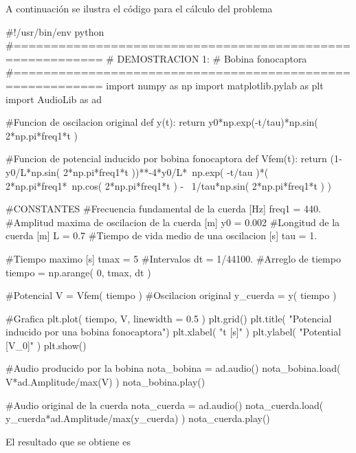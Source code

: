 A continuación se ilustra el código para el cálculo del problema 
\begin{listing}[style=python]
#!/usr/bin/env python
#==========================================================
# DEMOSTRACION 1:
# Bobina fonocaptora
#==========================================================
import numpy as np
import matplotlib.pylab as plt
import AudioLib as ad

#Funcion de oscilacion original
def y(t):
    return y0*np.exp(-t/tau)*np.sin( 2*np.pi*freq1*t )

#Funcion de potencial inducido por bobina fonocaptora
def Vfem(t):
    return (1-y0/L*np.sin( 2*np.pi*freq1*t ))**-4*y0/L*\
    np.exp( -t/tau )*( 2*np.pi*freq1*\
    np.cos( 2*np.pi*freq1*t ) - \
    1/tau*np.sin( 2*np.pi*freq1*t ) )


#CONSTANTES
#Frecuencia fundamental de la cuerda [Hz]
freq1 = 440.
#Amplitud maxima de oscilacion de la cuerda [m]
y0 = 0.002
#Longitud de la cuerda [m]
L = 0.7
#Tiempo de vida medio de una oscilacion [s]
tau = 1.

#Tiempo maximo [s]
tmax = 5
#Intervalos
dt = 1/44100.
#Arreglo de tiempo 
tiempo = np.arange( 0, tmax, dt )

#Potencial
V = Vfem( tiempo )
#Oscilacion original
y_cuerda = y( tiempo )

#Grafica
plt.plot( tiempo, V, linewidth = 0.5 )
plt.grid()
plt.title( "Potencial inducido por una bobina fonocaptora")
plt.xlabel( "t [s]" )
plt.ylabel( "Potential [V_0]" )
plt.show()

#Audio producido por la bobina
nota_bobina = ad.audio()
nota_bobina.load( V*ad.Amplitude/max(V) )
nota_bobina.play()

#Audio original de la cuerda
nota_cuerda = ad.audio()
nota_cuerda.load( y_cuerda*ad.Amplitude/max(y_cuerda) )
nota_cuerda.play()
\end{listing}


El resultado que se obtiene es


